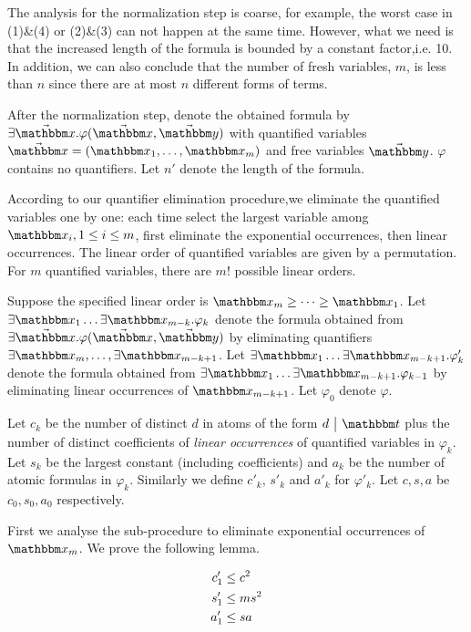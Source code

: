 The analysis for the normalization step is coarse, for example, the worst case in (1)\&(4) or (2)\&(3) can not happen at the same time. However, what we need is that the increased length of the formula is bounded by a constant factor,i.e. 10. In addition, we can also conclude that the number of fresh variables, $m$, is less than $n$ since there are at most $n$ different forms of terms. 

After the normalization step, denote the obtained formula by $\exists \vec{\ivarx}. \varphi(\vec{\ivarx},\vec{\ivary})$ with quantified variables $\vec{\ivarx} = (\ivarx_1,\dots,\ivarx_m)$ and free variables $\vec{\ivary}$. $\varphi$ contains no quantifiers. 
Let $n'$ denote the length of the formula.

According to our quantifier elimination procedure,we eliminate the quantified variables one by one: each time select the largest variable among $\ivarx_i,1\le i\le m$, first eliminate the exponential occurrences, then linear occurrences. The linear order of quantified variables are given by a permutation. For $m$ quantified variables, there are $m!$ possible linear orders.

Suppose the specified linear order is $\ivarx_m\ge \dots \ge \ivarx_1$. Let $\exists \ivarx_1\dots \exists\ivarx_{m-k}.\varphi_k$ denote the formula obtained from $\exists \vec{\ivarx}. \varphi(\vec{\ivarx},\vec{\ivary})$ by eliminating quantifiers $\exists \ivarx_m,\dots,\exists\ivarx_{m-k+1}$. Let $\exists \ivarx_1 \dots \exists \ivarx_{m-k+1}.\varphi'_k$ denote the formula obtained from $\exists \ivarx_1\dots \exists\ivarx_{m-k+1}.\varphi_{k-1}$ by eliminating linear occurrences of $\ivarx_{m-k+1}$. Let $\varphi_0$ denote $\varphi$.

Let $c_k$ be the number of distinct $d$ in atoms of the form $d \ \big \vert  \ \iterm$ plus the number of distinct coefficients of \emph{linear occurrences} of quantified variables in $\varphi_k$. Let $s_k$ be the largest constant (including coefficients) and $a_k$ be the number of atomic formulas in $\varphi_k$. Similarly we define $c'_k$, $s'_k$ and $a'_k$ for $\varphi'_k$. Let $c,s,a$ be $c_0,s_0,a_0$ respectively. 

First we analyse the sub-procedure to eliminate exponential occurrences of $\ivarx_m$. We prove the following lemma.

\begin{lemma}\label{lem:cpx exp}
    \begin{align}
        c'_1&\le c^2 \notag \\
        s'_1&\le ms^2 \notag\\
        a'_1&\le sa\notag 
    \end{align} 
\end{lemma}

